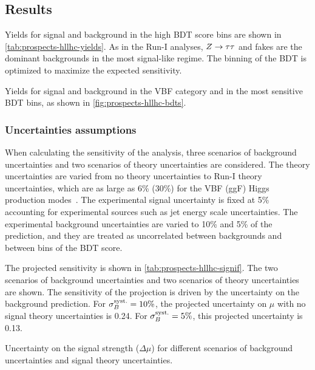 \subsection{Results}

Yields for signal and background in the high BDT score bins are shown in \cref{tab:prospects-hllhc-yields}. As in the Run-I analyses, $Z\rightarrow\tau\tau$ and fakes are the dominant backgrounds in the most signal-like regime. The binning of the BDT is optimized to maximize the expected sensitivity.

\begin{table}[!htpb]
  \centering
  \renewcommand{\arraystretch}{1.4}
  \caption{Yields for signal and background in the VBF category and in the most sensitive BDT bins, as shown in \cref{fig:prospects-hllhc-bdts}.}
  
  \label{tab:prospects-hllhc-yields}
\end{table}

\subsubsection{Uncertainties assumptions}

When calculating the sensitivity of the analysis, three scenarios of background uncertainties and two scenarios of theory uncertainties are considered. The theory uncertainties are varied from no theory uncertainties to Run-I theory uncertainties, which are as large as 6\% (30\%) for the VBF (ggF) Higgs production modes~\cite{HIGG-2013-32}. The experimental signal uncertainty is fixed at 5\% accounting for experimental sources such as jet energy scale uncertainties. The experimental background uncertainties are varied to 10\% and 5\% of the prediction, and they are treated as uncorrelated between backgrounds and between bins of the BDT score.

The projected sensitivity is shown in \cref{tab:prospects-hllhc-signif}. The two scenarios of background uncertainties and two scenarios of theory uncertainties are shown. The sensitivity of the projection is driven by the uncertainty on the background prediction. For $\sigma_{B}^{\text{syst.}} = 10\%$, the projected uncertainty on $\mu$ with no signal theory uncertainties is 0.24. For $\sigma_{B}^{\text{syst.}} = 5\%$, this projected uncertainty is 0.13.

\begin{table}[!htpb]
  \centering
  \renewcommand{\arraystretch}{1.4}
  \caption{Uncertainty on the signal strength ($\Delta\mu$) for different scenarios of background uncertainties and signal theory uncertainties.}
  
  \label{tab:prospects-hllhc-signif}
\end{table}

